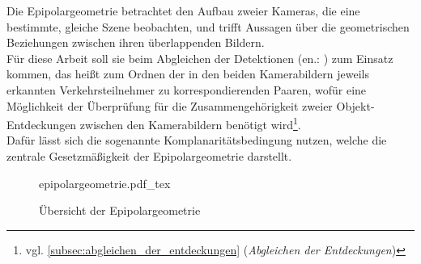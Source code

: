Die Epipolargeometrie betrachtet den Aufbau zweier Kameras, die eine bestimmte, gleiche Szene beobachten, und trifft Aussagen über die geometrischen Beziehungen zwischen ihren überlappenden Bildern.\\
Für diese Arbeit soll sie beim Abgleichen der Detektionen (en.: ) zum Einsatz kommen, das heißt zum Ordnen der in den beiden Kamerabildern jeweils erkannten Verkehrsteilnehmer zu korrespondierenden Paaren, wofür eine Möglichkeit der Überprüfung für die Zusammengehörigkeit zweier Objekt-Entdeckungen zwischen den Kamerabildern benötigt wird\footnote{vgl. \ref{subsec:abgleichen_der_entdeckungen} (\emph{Abgleichen der Entdeckungen})}.\\
Dafür lässt sich die sogenannte Komplanaritätsbedingung nutzen, welche die zentrale Gesetzmäßigkeit der Epipolargeometrie darstellt.\kleinerabstand

\begin{figure}[H]
	\centering
	\def\svgwidth{12cm}
	{epipolargeometrie.pdf_tex}\kleinerabstand
	\caption{Übersicht der Epipolargeometrie}
	\label{fig:epipolargeometrie}
\end{figure}
